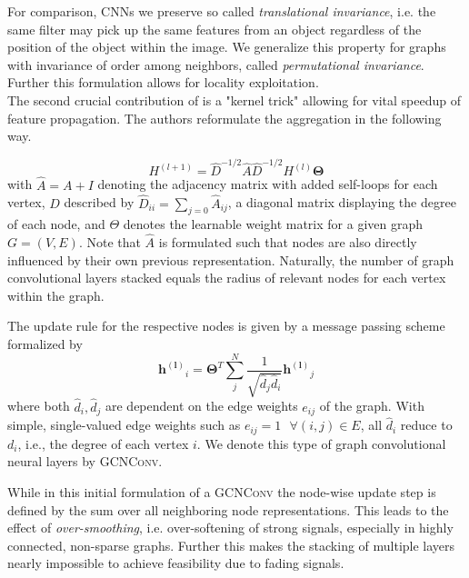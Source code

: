 \documentclass[]{article}
\begin{document}
For comparison, CNNs we preserve so called \textit{translational invariance}, i.e. the same filter may pick up the same features from an object regardless of the position of the object within the image. We generalize this property for graphs with invariance of order among neighbors, called \textit{permutational invariance}. Further this formulation allows for locality exploitation.\\


The second crucial contribution of \citet{GCNConv} is a "kernel trick" allowing for vital speedup of feature propagation. The authors reformulate the aggregation in the following way. 

\begin{equation}
	H^{(l+1)} = \hat{D}^{-1/2} \hat{A}
	\hat{D}^{-1/2} H^{(l)} \mathbf{\Theta}
\end{equation}
with $\hat{A} = A + I$ denoting the
adjacency matrix with added self-loops for each vertex, $D$ described by $\hat{D}_{ii} = \sum_{j=0} \hat{A}_{ij}$, a diagonal
matrix displaying the degree of each node, and $\Theta$ denotes the
learnable weight matrix for a given graph $G=(V,E)$.
Note that $\hat{A}$ is formulated such that nodes are also directly influenced by their own previous representation.
Naturally, the number of graph convolutional layers stacked equals the radius of
relevant nodes for each vertex within the graph.

The update rule for the respective nodes is given by a message passing scheme
formalized by
\begin{equation}
	\mathbf{h^{(l)}}_i = \mathbf{\Theta}^T \sum^{N}_{j}
	\frac{1}{\sqrt{\hat{d}_j \hat{d}_i}} \mathbf{h^{(l)}}_j
\end{equation}
where both $\hat{d}_i, \hat{d}_j$ are dependent on the edge weights
$e_{ij}$ of the graph. With simple, single-valued edge weights such as
$e_{ij}=1 \text{ }\forall (i,j)\in E$, all $\hat{d}_i$ reduce to
$d_i$, i.e., the degree of each vertex $i$. We denote this type of
graph convolutional neural layers by \textsc{GCNConv}.

While in this initial formulation of a \textsc{GCNConv} the node-wise update
step is defined by the sum over all neighboring node representations. This leads to the effect of \textit{over-smoothing}, i.e. over-softening of strong signals, especially in highly connected, non-sparse graphs. Further this makes the stacking of multiple layers nearly impossible to achieve feasibility due to fading signals.\\
\end{document}
